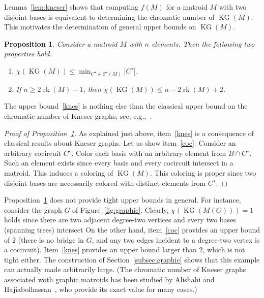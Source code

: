 \documentclass[12pt]{amsart}
\theoremstyle{plain}
\newtheorem{proposition}[theorem]{Proposition}
\theoremstyle{definition}
\theoremstyle{remark}
\renewcommand{\leq}{\leqslant}
\renewcommand{\geq}{\geqslant}
\newcommand{\rk}{\operatorname{rk}}
\def \KG {\operatorname{KG}}
\def\calC{\mathcal{C}}
\begin{document}
Lemma~\ref{lem:kneser} shows that computing $f(M)$ for a matroid $M$ with two disjoint bases is equivalent to determining the chromatic number of $\KG(M)$. This motivates the determination of general upper bounds on $\KG(M)$.

\begin{proposition}\label{prop:upper}
Consider a matroid $M$ with $n$ elements. Then the following two properties hold.
\begin{enumerate}[label=\textup{(\roman*)}]
\item \label{coc} $\chi(\KG(M)) \leq \min_{C^\star\in\calC^\star(M)}|C^\star|$.\smallskip
\item \label{knes} If $n \geq 2 \rk(M) - 1$, then $\chi(\KG(M)) \leq  n - 2 \rk(M) +2$.
\end{enumerate}
\end{proposition}

The upper bound~\ref{knes} is nothing else than the classical upper bound on the chromatic number of Kneser graphs; see, e.g.,~\cite{lovasz1978kneser}.

\begin{proof}[Proof of Proposition~\ref{prop:upper}]
As explained just above, item~\ref{knes} is a consequence of classical results about Kneser graphs. Let us show item~\ref{coc}. Consider an arbitrary cocircuit $C^\star$. Color each basis with an arbitrary element from $B \cap C^\star$. Such an element exists since every basis and every cocircuit intersect in a matroid. This induces a coloring of $\KG(M)$. This coloring is proper since two disjoint bases are necessarily colored with distinct elements from $C^\star$.
\end{proof}

Proposition~\ref{prop:upper} does not provide tight upper bounds in general. For instance, consider the graph $G$ of Figure~\ref{fig:graphic}. Clearly, $\chi(\KG(M(G)))=1$ holds since there are two adjacent degree-two vertices and every two bases (spanning trees) intersect
On the other hand, item~\ref{coc} provides an upper bound of $2$ (there is no bridge in $G$, and any two edges incident to a degree-two vertex is a cocircuit). Item~\ref{knes} provides an upper bound larger than $2$, which is not tight either. The construction of Section~\ref{subsec:graphic} shows that this example can actually made arbitrarily large. (The chromatic number of Kneser graphs associated woth graphic matroids has been studied by Alishahi and Hajiabolhassan~\cite{alishahi2019chromatic}, who provide its exact value for many cases.)
\end{document}
